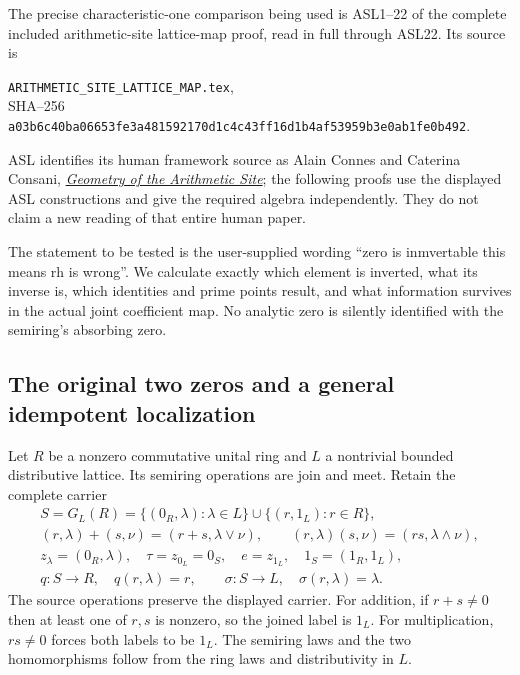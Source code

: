 The precise characteristic-one comparison being used is ASL1--22 of
the complete included arithmetic-site lattice-map proof, read in full
through ASL22. Its source is
\begin{center}\small
\nolinkurl{ARITHMETIC_SITE_LATTICE_MAP.tex},\\
SHA--256
\nolinkurl{a03b6c40ba06653fe3a481592170d1c4c43ff16d1b4af53959b3e0ab1fe0b492}.
\end{center}
ASL identifies its human framework source as Alain Connes and Caterina
Consani, \href{https://arxiv.org/abs/1502.05580}{\emph{Geometry of the
Arithmetic Site}}; the following proofs use the displayed ASL
constructions and give the required algebra independently. They do
not claim a new reading of that entire human paper.

The statement to be tested is the user-supplied wording
``zero is inmvertable this means rh is wrong''. We calculate exactly
which element is inverted, what its inverse is, which identities and
prime points result, and what information survives in the actual
joint coefficient map. No analytic zero is silently identified with
the semiring's absorbing zero.

\subsection{The original two zeros and a general idempotent localization}

Let $R$ be a nonzero commutative unital ring and $L$ a nontrivial
bounded distributive lattice. Its semiring operations are join and
meet. Retain the complete carrier
\begin{equation}\tag{ZIL1}
\begin{gathered}
 S=G_L(R)=\{(0_R,\lambda):\lambda\in L\}
                 \cup\{(r,1_L):r\in R\},\\
 (r,\lambda)+(s,\nu)=(r+s,\lambda\vee\nu),\qquad
 (r,\lambda)(s,\nu)=(rs,\lambda\wedge\nu),\\
 z_\lambda=(0_R,\lambda),\quad
 \tau=z_{0_L}=0_S,\quad e=z_{1_L},\quad
 1_S=(1_R,1_L),\\
 q:S\longrightarrow R,\quad q(r,\lambda)=r,\qquad
 \sigma:S\longrightarrow L,\quad\sigma(r,\lambda)=\lambda.
\end{gathered}
\end{equation}
The source operations preserve the displayed carrier. For addition,
if $r+s\ne0$ then at least one of $r,s$ is nonzero, so the joined
label is $1_L$. For multiplication, $rs\ne0$ forces both labels to
be $1_L$. The semiring laws and the two homomorphisms follow from
the ring laws and distributivity in $L$.

